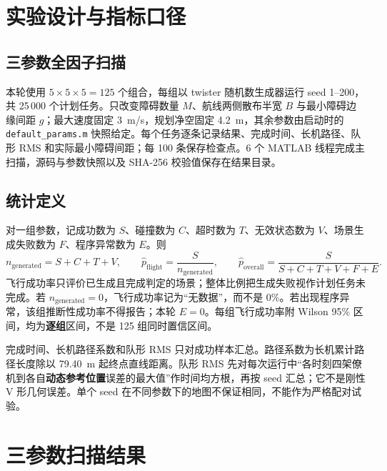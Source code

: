 \documentclass[UTF8,a4paper,11pt,fontset=windows]{ctexart}
\newcommand{\code}[1]{\texttt{#1}}
\begin{document}
\section{实验设计与指标口径}
\subsection{三参数全因子扫描}
本轮使用 $5\times5\times5=125$ 个组合，每组以 twister 随机数生成器运行 seed 1--200，共 25\,000 个计划任务。只改变障碍数量 $M$、航线两侧散布半宽 $B$ 与最小障碍边缘间距 $g$；最大速度固定 \SI{3}{m/s}，规划净空固定 \SI{4.2}{m}，其余参数由启动时的 \code{default\_params.m} 快照给定。每个任务逐条记录结果、完成时间、长机路径、队形 RMS 和实际最小障碍间距；每 100 条保存检查点。6 个 MATLAB 线程完成主扫描，源码与参数快照以及 SHA-256 校验值保存在结果目录。

\subsection{统计定义}
对一组参数，记成功数为 $S$、碰撞数为 $C$、超时数为 $T$、无效状态数为 $V$、场景生成失败数为 $F$、程序异常数为 $E$。则
\begin{equation}
n_{\mathrm{generated}}=S+C+T+V,\qquad
\widehat p_{\mathrm{flight}}=\frac{S}{n_{\mathrm{generated}}},\qquad
\widehat p_{\mathrm{overall}}=\frac{S}{S+C+T+V+F+E}.
\end{equation}
飞行成功率只评价已生成且完成判定的场景；整体比例把生成失败视作计划任务未完成。若 $n_{\mathrm{generated}}=0$，飞行成功率记为“无数据”，而不是 0\%。若出现程序异常，该组推断性成功率不得报告；本轮 $E=0$。每组飞行成功率附 Wilson 95\% 区间，均为\textbf{逐组}区间，不是 125 组同时置信区间。

完成时间、长机路径系数和队形 RMS 只对成功样本汇总。路径系数为长机累计路径长度除以 \SI{79.40}{m} 起终点直线距离。队形 RMS 先对每次运行中“各时刻四架僚机到各自\textbf{动态参考位置}误差的最大值”作时间均方根，再按 seed 汇总；它不是刚性 V 形几何误差。单个 seed 在不同参数下的地图不保证相同，不能作为严格配对试验。

\section{三参数扫描结果}
\end{document}
